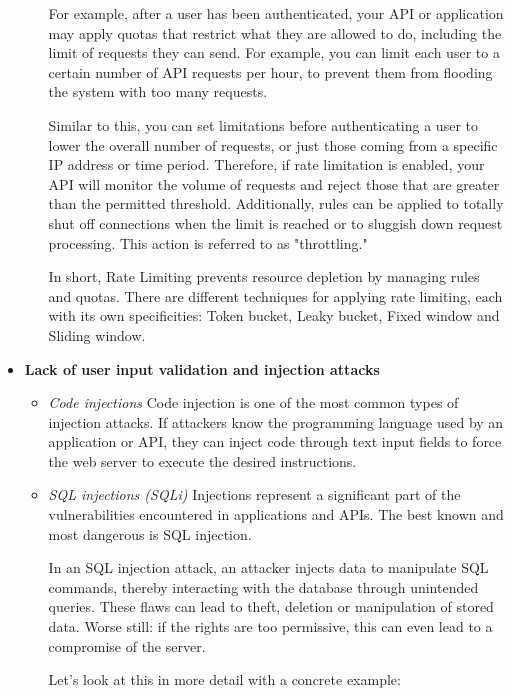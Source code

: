 \begin{itemize}
\begin{itemize}
        For example, after a user has been authenticated, your API or application may apply quotas that restrict what they are allowed to do, including the limit of requests they can send.  For example, you can limit each user to a certain number of API requests per hour, to prevent them from flooding the system with too many requests.

        Similar to this, you can set limitations before authenticating a user to lower the overall number of requests, or just those coming from a specific IP address or time period. Therefore, if rate limitation is enabled, your API will monitor the volume of requests and reject those that are greater than the permitted threshold. Additionally, rules can be applied to totally shut off connections when the limit is reached or to sluggish down request processing. This action is referred to as "throttling."
        
        In short, Rate Limiting prevents resource depletion by managing rules and quotas.  There are different techniques for applying rate limiting, each with its own specificities: Token bucket, Leaky bucket, Fixed window and Sliding window.
    \end{itemize}
    \item \textbf{Lack of user input validation and injection attacks}
    \begin{itemize}
        \item \textit{Code injections}
        \newline
        Code injection is one of the most common types of injection attacks. If attackers know the programming language used by an application or API, they can inject code through text input fields to force the web server to execute the desired instructions.
        \item \textit{SQL injections (SQLi)}
        \newline
        Injections represent a significant part of the vulnerabilities encountered in applications and APIs. The best known and most dangerous is SQL injection.

        In an SQL injection attack, an attacker injects data to manipulate SQL commands, thereby interacting with the database through unintended queries. These flaws can lead to theft, deletion or manipulation of stored data. Worse still: if the rights are too permissive, this can even lead to a compromise of the server. 

        Let’s look at this in more detail with a concrete example:
        

\end{itemize}
\end{itemize}
